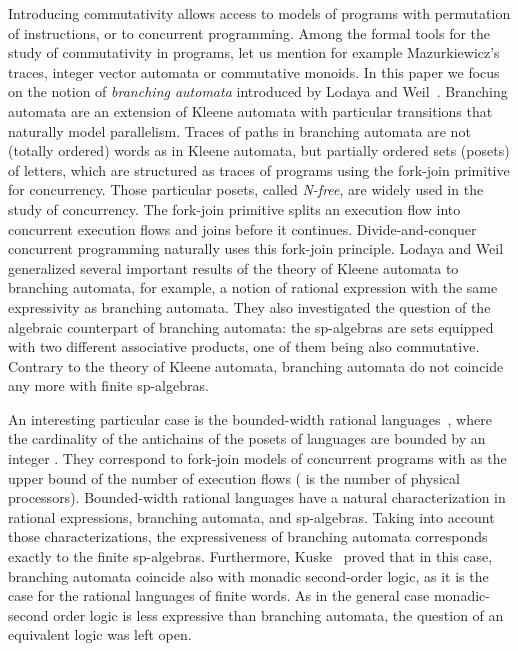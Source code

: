 \documentclass{CSML}
\begin{document}
Introducing commutativity allows access to models of programs with permutation of instructions, or to concurrent programming. Among the formal tools for the study of commutativity in programs, let us mention for example Mazurkiewicz's traces, integer vector automata or commutative monoids. In this paper we focus on the notion of \emph{branching automata} introduced by Lodaya and Weil~\cite{lodaya98kleene,LW98:Algebra,LW00:sp,lodaya01kleene}. Branching automata are an extension of Kleene automata with particular transitions that naturally model parallelism. Traces of paths in branching automata are not (totally ordered) words as in Kleene automata, but partially ordered sets (posets) of letters, which are structured as traces of programs using the fork-join primitive for concurrency. Those particular posets, called \emph{N-free}, are widely used in the study of concurrency. The fork-join primitive splits an execution flow  into  concurrent execution flows and joins  before it continues. Divide-and-conquer concurrent programming naturally uses this fork-join principle. Lodaya and Weil generalized several important results of the theory of Kleene automata to branching automata, for example, a notion of rational expression with the same expressivity as branching automata. They also investigated the question of the algebraic counterpart of branching automata: the sp-algebras are sets equipped with two different associative products, one of them being also commutative. Contrary to the theory of Kleene automata, branching automata do not coincide any more with finite sp-algebras. 

An interesting particular case is the bounded-width rational languages~\cite{LW00:sp}, where the cardinality of the antichains of the posets of languages are bounded by an integer . They correspond to fork-join models of concurrent programs with  as the upper bound of the number of execution flows ( is the number of physical processors). Bounded-width rational languages have a natural characterization in rational expressions, branching automata, and sp-algebras. Taking into account those characterizations, the expressiveness of branching automata corresponds exactly to the finite sp-algebras. Furthermore, Kuske~\cite{Kus00:SPInf} proved that in this case, branching automata coincide also with monadic second-order logic, as it is the case for the rational languages of finite words. As in the general case monadic-second order logic is less expressive than branching automata, the question of an equivalent logic was left open.
\end{document}
